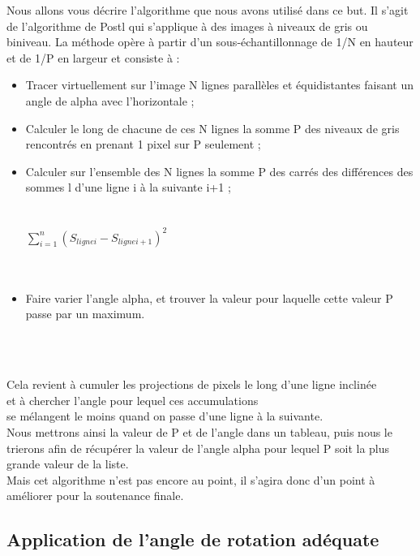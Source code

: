 \documentclass [french,12pt]{article}
\begin{document}
Nous allons vous décrire l'algorithme que nous avons utilisé dans ce but.
Il s'agit de l'algorithme de Postl qui s'applique à des images à niveaux de gris ou biniveau. La méthode opère à partir d'un sous-échantillonnage de 1/N en hauteur et de 1/P en largeur et consiste à :
\\
\begin{itemize}
\item Tracer virtuellement sur l'image N lignes parallèles et équidistantes faisant un angle de alpha avec l'horizontale ;
\\


\item Calculer le long de chacune de ces N lignes la somme P des niveaux de gris rencontrés en prenant 1 pixel sur P seulement ;
\\
\item Calculer sur l’ensemble des N lignes la somme P des carrés des différences des sommes l d’une ligne i à la suivante i+1 ;
\\
\\
\\
$\sum_{i=1}^{n} (S_{ligne i}-S_{ligne i+1})^{2}$
\\
\\
\\
\item Faire varier l’angle alpha, et trouver la valeur pour laquelle cette valeur P passe par un maximum.

\\

\end{itemize}
\\
Cela revient à cumuler les projections de pixels le long d’une ligne inclinée
\\ et à chercher l’angle pour lequel ces accumulations
 \\se mélangent le moins quand on passe d’une ligne à la suivante.
\\
Nous mettrons ainsi la valeur de P et de l'angle dans un tableau, puis nous le trierons afin de récupérer la valeur de l'angle alpha pour lequel P soit la plus grande valeur de la liste.
\\
Mais cet algorithme n'est pas encore au point, il s'agira donc d'un point à améliorer pour la soutenance finale.

\subsection{Application de l'angle de rotation adéquate}
\end{document}
